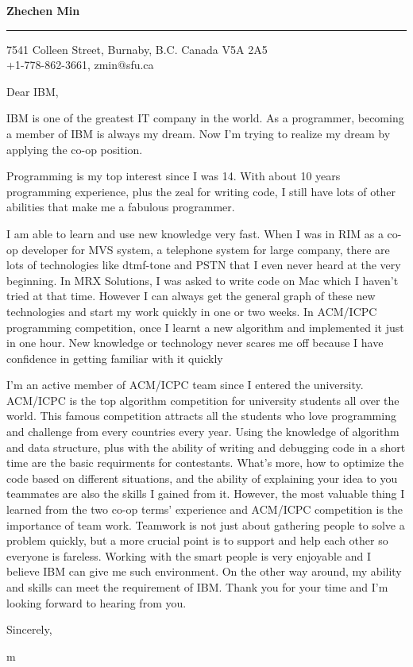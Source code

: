 \documentclass{letter} %
\begin{document}
\signature{Zhechen Min}           %
\longindentation=0pt                       %
\let\raggedleft\raggedright                %
 
 
\begin{letter}{}


\begin{flushleft}
{\large\bf Zhechen Min}
\end{flushleft}
\medskip\hrule height 1pt
\begin{flushright}
\hfill 7541 Colleen Street, Burnaby, B.C. Canada V5A 2A5 \\
\hfill +1-778-862-3661, zmin@sfu.ca
\end{flushright} 
\vfill %

 
\opening{Dear IBM,} 
 
\noindent IBM is one of the greatest IT company in the world. As a programmer, becoming a member of IBM is always my dream. Now I'm trying to realize my dream by applying the co-op position.

\noindent Programming is my top interest since I was 14. With about 10 years programming experience, plus the zeal for writing code, I still have lots of other abilities that make me a fabulous programmer. 

\noindent I am able to learn and use new knowledge very fast. When I was in RIM as a co-op developer for MVS system, a telephone system for large company, there are lots of technologies like dtmf-tone and PSTN that I even never heard at the very beginning. In MRX Solutions, I was asked to write code on Mac which I haven't tried at that time. However I can always get the general graph of these new technologies and start my work quickly in one or two weeks. In ACM/ICPC programming competition, once I learnt a new algorithm and implemented it just in one hour. New knowledge or technology never scares me off because I have confidence in getting familiar with it quickly

\noindent I'm an active member of ACM/ICPC team since I entered the university. ACM/ICPC is the top algorithm competition for university students all over the world. This famous competition attracts all the students who love programming and challenge from every countries every year. Using the knowledge of algorithm and data structure, plus with the ability of writing and debugging code in a short time are the basic requirments for contestants. What's more, how to optimize the code based on different situations, and the ability of explaining your idea to you teammates are also the skills I gained from it. 
\noindent However, the most valuable thing I learned from the two co-op terms' experience and ACM/ICPC competition is the importance of team work. Teamwork is not just about gathering people to solve a problem quickly, but a more crucial point is to support and help each other so everyone is fareless. Working with the smart people is very enjoyable and I believe IBM can give me such environment. On the other way around, my ability and skills can meet the requirement of IBM. Thank you for your time and I'm looking forward to hearing from you. 

\closing{Sincerely,} 
 

 m%

\end{letter}
 
\end{document}
